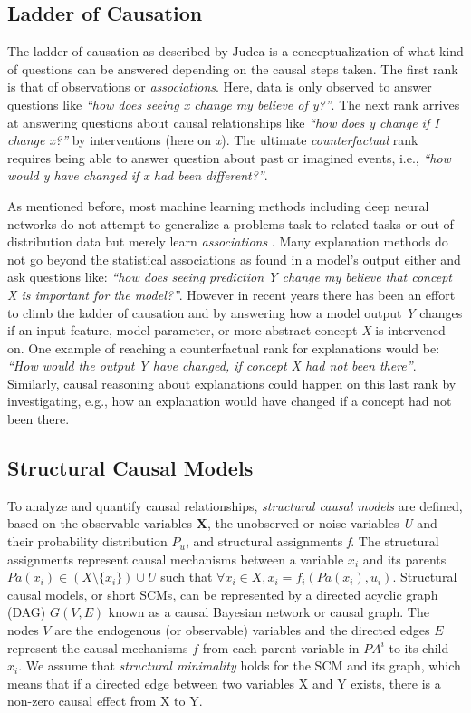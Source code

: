 \subsection{Ladder of Causation}
The ladder of causation as described by Judea \citet{Pearl2009} is a conceptualization of what kind of questions can be answered depending on the causal steps taken.
The first rank is that of observations or \textit{associations}. Here, data is only observed to answer questions like \textit{``how does seeing x change my believe of y?''}.
The next rank arrives at answering questions about causal relationships like \textit{``how does y change if I change x?''} by interventions (here on \textit{x}). The ultimate \textit{counterfactual} rank requires being able to answer question about past or imagined events, i.e., \textit{``how would y have changed if x had been different?''}.

As mentioned before, most machine learning methods including deep neural networks do not attempt to generalize a problems task to related tasks or out-of-distribution data but merely learn \textit{associations} \citep{Schoelkopf2019}. Many explanation methods do not go beyond the statistical associations as found in a model's output either and ask questions like: \textit{``how does seeing prediction Y change my believe that concept X is important for the model?''}. However in recent years there has been an effort to climb the ladder of causation and by answering how a model output \textit{Y} changes if an input feature, model parameter, or more abstract concept \textit{X} is intervened on. One example of reaching a counterfactual rank for explanations would be: \textit{``How would the output Y have changed, if concept X had not been there''}. Similarly, causal reasoning about explanations could happen on this last rank by investigating, e.g., how an explanation would have changed if a concept had not been there. 

\subsection{Structural Causal Models}
To analyze and quantify causal relationships, \textit{structural causal models} are defined, based on the observable variables \textbf{X}, the unobserved or noise variables \textit{U} and their probability distribution $P_u$, and structural assignments \textit{f}. The structural assignments represent causal mechanisms between a variable $x_i$ and its parents $Pa(x_i) \in (X \setminus \{x_i\}) \cup U$  such that $\forall x_i \in X, x_i = f_i(Pa(x_i),u_i)$. 
Structural causal models, or short SCMs, can be represented by a directed acyclic graph (DAG) $G(V,E)$ known as a causal Bayesian network or causal graph. The nodes $V$ are the endogenous (or observable) variables and the directed edges $E$ represent the causal mechanisms $f$ from each parent variable in $PA^i$ to its child $x_i$. We assume that \textit{structural minimality} holds for the SCM and its graph, which means that if a directed edge between two variables X and Y exists, there is a non-zero causal effect from X to Y. 


